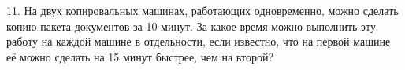 11. На двух копировальных машинах, работающих одновременно, можно сделать копию пакета документов за 10 минут. За какое время можно выполнить эту работу на каждой машине в отдельности, если известно, что на первой машине её можно сделать на 15 минут быстрее, чем на второй?\\
